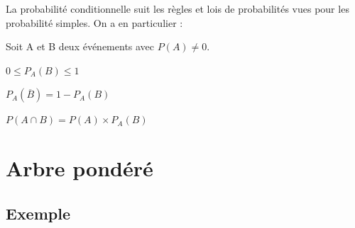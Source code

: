 \begin{remarque}
	La probabilité conditionnelle suit les règles et lois de probabilités vues pour les probabilité simples. On a en particulier :
\end{remarque}

\begin{propriete}
	Soit A et B deux événements avec $P(A)\neq 0$.
	\begin{itemDef}
		\item $0\leq P_A(B)\leq 1$
		\item $P_A(\overline{B})=1-P_A(B)$
		\item $P(A \cap B)=P(A)\times P_A (B)$
	\end{itemDef}
\end{propriete}

\section{Arbre pondéré}

\subsection{Exemple}


